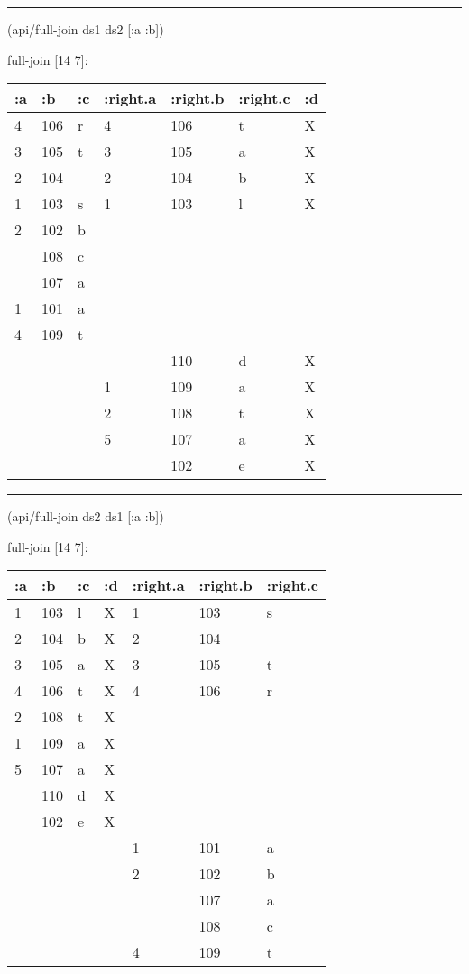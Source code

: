 \documentclass[]{article}
\newenvironment{Shaded}{\begin{snugshade}}{\end{snugshade}}
\newcommand{\AttributeTok}[1]{\textcolor[rgb]{0.77,0.63,0.00}{#1}}
\newcommand{\NormalTok}[1]{#1}
\begin{document}
\begin{center}\rule{0.5\linewidth}{0.5pt}\end{center}

\begin{Shaded}
\begin{Highlighting}[]
\NormalTok{(api/full-join ds1 ds2 [}\AttributeTok{:a} \AttributeTok{:b}\NormalTok{])}
\end{Highlighting}
\end{Shaded}

full-join {[}14 7{]}:

\begin{longtable}[]{@{}lllllll@{}}
\toprule
:a & :b & :c & :right.a & :right.b & :right.c & :d\tabularnewline
\midrule
\endhead
4 & 106 & r & 4 & 106 & t & X\tabularnewline
3 & 105 & t & 3 & 105 & a & X\tabularnewline
2 & 104 & & 2 & 104 & b & X\tabularnewline
1 & 103 & s & 1 & 103 & l & X\tabularnewline
2 & 102 & b & & & &\tabularnewline
& 108 & c & & & &\tabularnewline
& 107 & a & & & &\tabularnewline
1 & 101 & a & & & &\tabularnewline
4 & 109 & t & & & &\tabularnewline
& & & & 110 & d & X\tabularnewline
& & & 1 & 109 & a & X\tabularnewline
& & & 2 & 108 & t & X\tabularnewline
& & & 5 & 107 & a & X\tabularnewline
& & & & 102 & e & X\tabularnewline
\bottomrule
\end{longtable}

\begin{center}\rule{0.5\linewidth}{0.5pt}\end{center}

\begin{Shaded}
\begin{Highlighting}[]
\NormalTok{(api/full-join ds2 ds1 [}\AttributeTok{:a} \AttributeTok{:b}\NormalTok{])}
\end{Highlighting}
\end{Shaded}

full-join {[}14 7{]}:

\begin{longtable}[]{@{}lllllll@{}}
\toprule
:a & :b & :c & :d & :right.a & :right.b & :right.c\tabularnewline
\midrule
\endhead
1 & 103 & l & X & 1 & 103 & s\tabularnewline
2 & 104 & b & X & 2 & 104 &\tabularnewline
3 & 105 & a & X & 3 & 105 & t\tabularnewline
4 & 106 & t & X & 4 & 106 & r\tabularnewline
2 & 108 & t & X & & &\tabularnewline
1 & 109 & a & X & & &\tabularnewline
5 & 107 & a & X & & &\tabularnewline
& 110 & d & X & & &\tabularnewline
& 102 & e & X & & &\tabularnewline
& & & & 1 & 101 & a\tabularnewline
& & & & 2 & 102 & b\tabularnewline
& & & & & 107 & a\tabularnewline
& & & & & 108 & c\tabularnewline
& & & & 4 & 109 & t\tabularnewline
\bottomrule
\end{longtable}
\end{document}
